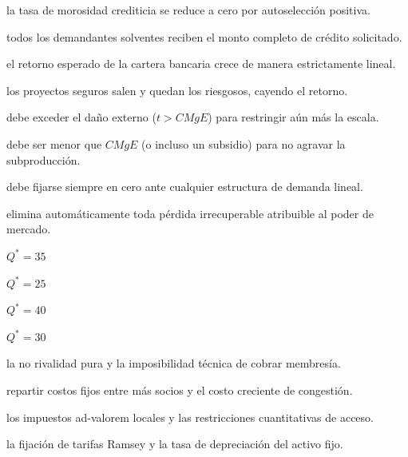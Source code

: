 \begin{opts}
    \item la tasa de morosidad crediticia se reduce a cero por autoselección positiva.
    \item todos los demandantes solventes reciben el monto completo de crédito solicitado.
    \item el retorno esperado de la cartera bancaria crece de manera estrictamente lineal.
    \item los proyectos seguros salen y quedan los riesgosos, cayendo el retorno.
\end{opts}

\begin{opts}
    \item debe exceder el daño externo ($t > CMgE$) para restringir aún más la escala.
    \item debe ser menor que $CMgE$ (o incluso un subsidio) para no agravar la subproducción.
    \item debe fijarse siempre en cero ante cualquier estructura de demanda lineal.
    \item elimina automáticamente toda pérdida irrecuperable atribuible al poder de mercado.
\end{opts}

\begin{opts}
    \item $Q^* = 35$
    \item $Q^* = 25$
    \item $Q^* = 40$
    \item $Q^* = 30$
\end{opts}

\begin{opts}
    \item la no rivalidad pura y la imposibilidad técnica de cobrar membresía.
    \item repartir costos fijos entre más socios y el costo creciente de congestión.
    \item los impuestos ad-valorem locales y las restricciones cuantitativas de acceso.
    \item la fijación de tarifas Ramsey y la tasa de depreciación del activo fijo.
\end{opts}

